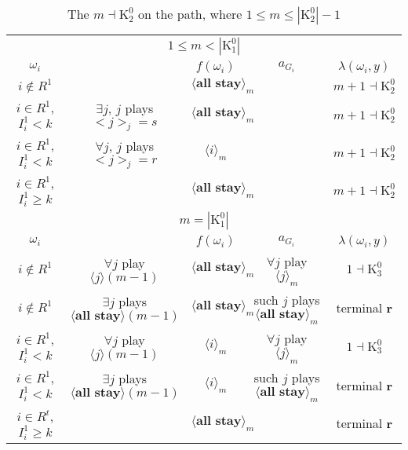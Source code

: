 \documentclass[12pt,letter]{article}
\newcommand{\Kappa}{\mathrm{K}}
\theoremstyle{definition}
\theoremstyle{remark}
\theoremstyle{claim}
\begin{document}
\begin{landscape}
\begin{table}[!htbp]
\caption{The $m\dashv\Kappa^0_{2}$ on the path, where $1\leq m \leq |\Kappa^0_2|-1$}
\begin{center}
\begin{tabular}{c c | c | c | c}
\multicolumn{5}{c}{$1\leq m < |\Kappa^0_1|$}\\
$\omega_i$ 	 & 	   &	$f(\omega_i)$  &	$a_{G_i}$ & $\lambda(\omega_i,y)$ \\
\hline
\hline
$i\notin R^1$  	& & $\langle \textbf{all stay} \rangle_m$	&    & $m+1\dashv \Kappa^0_{2}$\\
$i\in R^1$, $I^1_i< k$  	& $\exists j$, $j$ plays $<j>_j=s$	& $\langle \textbf{all stay} \rangle_m$	& 	& $m+1\dashv \Kappa^0_{2}$\\
$i\in R^1$, $I^1_i< k$  	& $\forall j$, $j$ plays $<j>_j=r$ 	& $\langle i \rangle_m$	& 	& $m+1\dashv \Kappa^0_{2}$\\
$i\in R^1$, $I^1_i\geq k$  	& 	& $\langle \textbf{all stay} \rangle_m$	&	& $m+1\dashv \Kappa^0_{2}$\\
\hline
\multicolumn{5}{c}{$m= |\Kappa^0_1|$}\\
$\omega_i$ 	 & 	   &	$f(\omega_i)$  &	$a_{G_i}$ & $\lambda(\omega_i,y)$ \\
\hline
\hline
$i\notin R^1$  	& $\forall j$ play $\langle j \rangle(m-1)$    & $\langle \textbf{all stay} \rangle_m$	& $\forall j$ play $\langle j \rangle_m$	& $1\dashv \Kappa^0_{3}$\\
$i\notin R^1$  	& $\exists j$ plays $\langle \textbf{all stay} \rangle(m-1)$   & $\langle \textbf{all stay} \rangle_m$	& such $j$ plays $\langle \textbf{all stay} \rangle_m$	& terminal \textbf{r}\\
$i\in R^1$, $I^1_i< k$   	& $\forall j$ play $\langle j \rangle(m-1)$ 	& $\langle i \rangle_m$	&  $\forall j$ play $\langle j \rangle_m$	& $1\dashv \Kappa^0_{3}$ \\
$i\in R^1$, $I^1_i< k$   	&  $\exists j$ plays $\langle \textbf{all stay} \rangle(m-1)$ 	& $\langle i \rangle_m$	& such $j$ plays $\langle \textbf{all stay} \rangle_m$	&  terminal \textbf{r}\\
$i\in R^t$, $I^1_i\geq k$  	& 	& $\langle \textbf{all stay} \rangle_m$	& 	& terminal \textbf{r} \\
\hline
\end{tabular}
\end{center}
\end{table}

\end{landscape}
\end{document}
